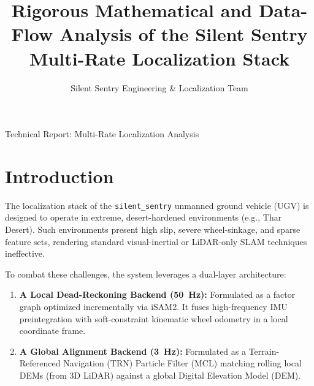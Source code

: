 \documentclass[10pt,journal,compsoc]{IEEEtran}
\begin{document}
\title{Rigorous Mathematical and Data-Flow Analysis of the Silent Sentry Multi-Rate Localization Stack}
\author{Silent Sentry Engineering \& Localization Team}

%
{Technical Report: Multi-Rate Localization Analysis}


\maketitle
\IEEEdisplaynontitleabstractindextext
\IEEEpeerreviewmaketitle

\section{Introduction}
The localization stack of the \texttt{silent\_sentry} unmanned ground vehicle (UGV) is designed to operate in extreme, desert-hardened environments (e.g., Thar Desert). Such environments present high slip, severe wheel-sinkage, and sparse feature sets, rendering standard visual-inertial or LiDAR-only SLAM techniques ineffective.

To combat these challenges, the system leverages a dual-layer architecture:
\begin{enumerate}
    \item \textbf{A Local Dead-Reckoning Backend (50~Hz):} Formulated as a factor graph optimized incrementally via iSAM2. It fuses high-frequency IMU preintegration with soft-constraint kinematic wheel odometry in a local coordinate frame.
    \item \textbf{A Global Alignment Backend (3~Hz):} Formulated as a Terrain-Referenced Navigation (TRN) Particle Filter (MCL) matching rolling local DEMs (from 3D LiDAR) against a global Digital Elevation Model (DEM).
\end{enumerate}
\end{document}
